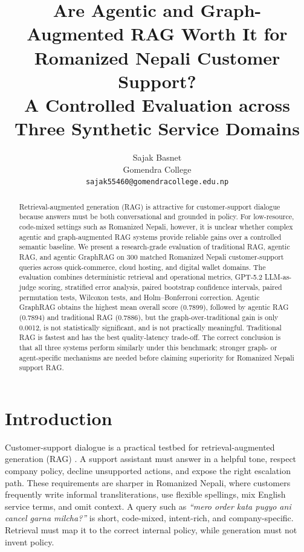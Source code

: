 \documentclass[10pt,twocolumn]{article}
\title{\vspace{-1.4em}
Are Agentic and Graph-Augmented RAG Worth It for Romanized Nepali Customer Support?\\
{\large A Controlled Evaluation across Three Synthetic Service Domains}}
\author{Sajak Basnet\\
Gomendra College\\
\texttt{sajak55460@gomendracollege.edu.np}}
\date{}
\begin{document}
\maketitle
\vspace{-1.6em}

\begin{abstract}
\noindent Retrieval-augmented generation (RAG) is attractive for customer-support dialogue because answers must be both conversational and grounded in policy. For low-resource, code-mixed settings such as Romanized Nepali, however, it is unclear whether complex agentic and graph-augmented RAG systems provide reliable gains over a controlled semantic baseline. We present a research-grade evaluation of traditional RAG, agentic RAG, and agentic GraphRAG on 300 matched Romanized Nepali customer-support queries across quick-commerce, cloud hosting, and digital wallet domains. The evaluation combines deterministic retrieval and operational metrics, GPT-5.2 LLM-as-judge scoring, stratified error analysis, paired bootstrap confidence intervals, paired permutation tests, Wilcoxon tests, and Holm--Bonferroni correction. Agentic GraphRAG obtains the highest mean overall score (0.7899), followed by agentic RAG (0.7894) and traditional RAG (0.7886), but the graph-over-traditional gain is only 0.0012, is not statistically significant, and is not practically meaningful. Traditional RAG is fastest and has the best quality-latency trade-off. The correct conclusion is that all three systems perform similarly under this benchmark; stronger graph- or agent-specific mechanisms are needed before claiming superiority for Romanized Nepali support RAG.
\end{abstract}

\section{Introduction}

Customer-support dialogue is a practical testbed for retrieval-augmented generation (RAG) \cite{lewis2020rag,gao2023rag}. A support assistant must answer in a helpful tone, respect company policy, decline unsupported actions, and expose the right escalation path. These requirements are sharper in Romanized Nepali, where customers frequently write informal transliterations, use flexible spellings, mix English service terms, and omit context. A query such as \emph{``mero order kata pugyo ani cancel garna milcha?''} is short, code-mixed, intent-rich, and company-specific. Retrieval must map it to the correct internal policy, while generation must not invent policy.
\end{document}
